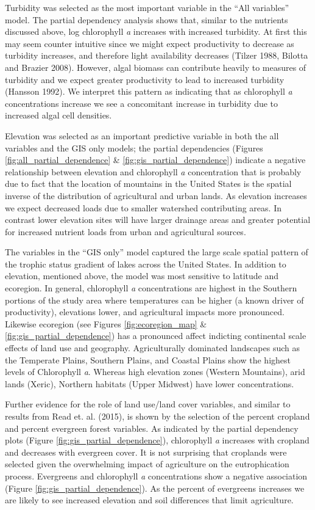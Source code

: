 \documentclass[12pt,]{article}
\begin{document}
Turbidity was selected as the most important variable in the ``All
variables'' model. The partial dependency analysis shows that, similar
to the nutrients discussed above, log chlorophyll \emph{a} increases
with increased turbidity. At first this may seem counter intuitive since
we might expect productivity to decrease as turbidity increases, and
therefore light availability decreases (Tilzer 1988, Bilotta and Brazier
2008). However, algal biomass can contribute heavily to measures of
turbidity and we expect greater productivity to lead to increased
turbidity (Hansson 1992). We interpret this pattern as indicating that
as chlorophyll \emph{a} concentrations increase we see a concomitant
increase in turbidity due to increased algal cell densities.

Elevation was selected as an important predictive variable in both the
all variables and the GIS only models; the partial dependencies (Figures
\ref{fig:all_partial_dependence} \& \ref{fig:gis_partial_dependence})
indicate a negative relationship between elevation and chlorophyll
\emph{a} concentration that is probably due to fact that the location of
mountains in the United States is the spatial inverse of the
distribution of agricultural and urban lands. As elevation increases we
expect decreased loads due to smaller watershed contributing areas. In
contrast lower elevation sites will have larger drainage areas and
greater potential for increased nutrient loads from urban and
agricultural sources.

The variables in the ``GIS only'' model captured the large scale spatial
pattern of the trophic status gradient of lakes across the United
States. In addition to elevation, mentioned above, the model was most
sensitive to latitude and ecoregion. In general, chlorophyll \emph{a}
concentrations are highest in the Southern portions of the study area
where temperatures can be higher (a known driver of productivity),
elevations lower, and agricultural impacts more pronounced. Likewise
ecoregion (see Figures \ref{fig:ecoregion_map} \&
\ref{fig:gis_partial_dependence}) has a pronounced affect indicting
continental scale effects of land use and geography. Agriculturally
dominated landscapes such as the Temperate Plains, Southern Plains, and
Coastal Plains show the highest levels of Chlorophyll \emph{a}. Whereas
high elevation zones (Western Mountains), arid lands (Xeric), Northern
habitats (Upper Midwest) have lower concentrations.

Further evidence for the role of land use/land cover variables, and
similar to results from Read et. al. (2015), is shown by the selection
of the percent cropland and percent evergreen forest variables. As
indicated by the partial dependency plots (Figure
\ref{fig:gis_partial_dependence}), chlorophyll \emph{a} increases with
cropland and decreases with evergreen cover. It is not surprising that
croplands were selected given the overwhelming impact of agriculture on
the eutrophication process. Evergreens and chlorophyll \emph{a}
concentrations show a negative association (Figure
\ref{fig:gis_partial_dependence}). As the percent of evergreens
increases we are likely to see increased elevation and soil differences
that limit agriculture.
\end{document}
